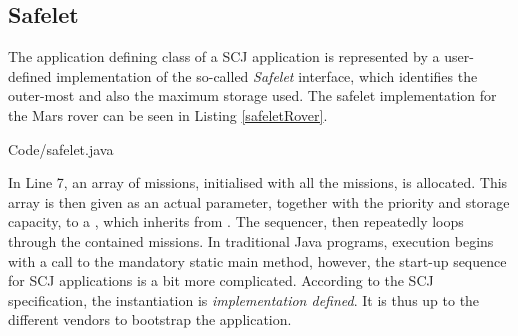 \subsection{Safelet}
\label{subsection:safelet}
The application defining class of a SCJ application is represented by a user-defined implementation of the so-called \textit{Safelet} interface, which identifies the outer-most  and also the maximum storage used. The safelet implementation for the Mars rover can be seen in Listing \ref{safeletRover}.


{Code/safelet.java}

In Line 7, an array of missions, initialised with all the missions, is allocated. This array is then given as an actual parameter, together with the priority and storage capacity, to a , which inherits from . The sequencer, then repeatedly loops through the contained missions. In traditional Java programs, execution begins with a call to the mandatory static main method, however, the start-up sequence for SCJ applications is a bit more complicated. According to the SCJ specification, the  instantiation is \textit{implementation defined}. It is thus up to the different vendors to bootstrap the application.